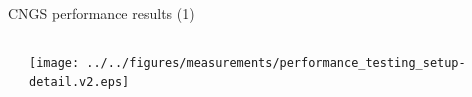 \documentclass[compress,red]{beamer}
\begin{document}
\begin{frame}{CNGS performance results (1)}
\begin{columns}[c]
\begin{center}

	  \end{center}
		\begin{center}
		\texttt{[image: ../../figures/measurements/performance\_testing\_setup-detail.v2.eps]}
		
		
		\end{center}
  \end{columns}


\end{frame}
\end{document}
